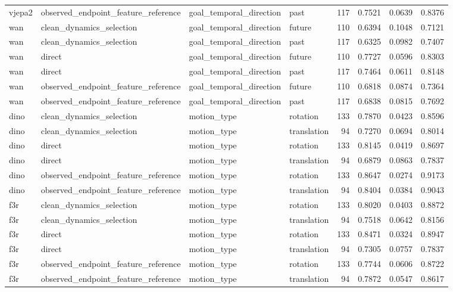 \begin{tabular}{llllrrrr}
vjepa2 & observed\_endpoint\_feature\_reference & goal\_temporal\_direction & past & 117 & 0.7521 & 0.0639 & 0.8376 \\
wan & clean\_dynamics\_selection & goal\_temporal\_direction & future & 110 & 0.6394 & 0.1048 & 0.7121 \\
wan & clean\_dynamics\_selection & goal\_temporal\_direction & past & 117 & 0.6325 & 0.0982 & 0.7407 \\
wan & direct & goal\_temporal\_direction & future & 110 & 0.7727 & 0.0596 & 0.8303 \\
wan & direct & goal\_temporal\_direction & past & 117 & 0.7464 & 0.0611 & 0.8148 \\
wan & observed\_endpoint\_feature\_reference & goal\_temporal\_direction & future & 110 & 0.6818 & 0.0874 & 0.7364 \\
wan & observed\_endpoint\_feature\_reference & goal\_temporal\_direction & past & 117 & 0.6838 & 0.0815 & 0.7692 \\
dino & clean\_dynamics\_selection & motion\_type & rotation & 133 & 0.7870 & 0.0423 & 0.8596 \\
dino & clean\_dynamics\_selection & motion\_type & translation & 94 & 0.7270 & 0.0694 & 0.8014 \\
dino & direct & motion\_type & rotation & 133 & 0.8145 & 0.0419 & 0.8697 \\
dino & direct & motion\_type & translation & 94 & 0.6879 & 0.0863 & 0.7837 \\
dino & observed\_endpoint\_feature\_reference & motion\_type & rotation & 133 & 0.8647 & 0.0274 & 0.9173 \\
dino & observed\_endpoint\_feature\_reference & motion\_type & translation & 94 & 0.8404 & 0.0384 & 0.9043 \\
f3r & clean\_dynamics\_selection & motion\_type & rotation & 133 & 0.8020 & 0.0403 & 0.8872 \\
f3r & clean\_dynamics\_selection & motion\_type & translation & 94 & 0.7518 & 0.0642 & 0.8156 \\
f3r & direct & motion\_type & rotation & 133 & 0.8471 & 0.0324 & 0.8947 \\
f3r & direct & motion\_type & translation & 94 & 0.7305 & 0.0757 & 0.7837 \\
f3r & observed\_endpoint\_feature\_reference & motion\_type & rotation & 133 & 0.7744 & 0.0606 & 0.8722 \\
f3r & observed\_endpoint\_feature\_reference & motion\_type & translation & 94 & 0.7872 & 0.0547 & 0.8617 \\

\end{tabular}
